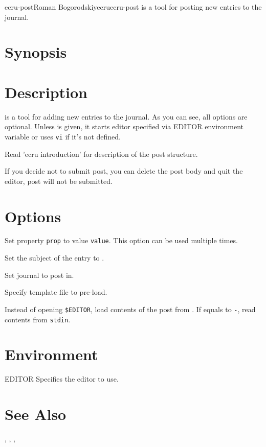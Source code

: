 \documentclass[english]{article}
\begin{document}
\begin{Name}{1}{ecru-post}{Roman Bogorodskiy}{ecru}{ecru-post}
	 is a tool for posting new entries to the journal.
\end{Name}

\section{Synopsis}

   
	 

 

\section{Description}
 is a tool for adding new entries to the journal. As you can see,
all options are optional. Unless  is given, it starts editor specified
via EDITOR environment variable or uses \texttt{vi} if it's not defined.

Read 'ecru introduction' for description of the post structure.

If you decide not to submit post, you can delete the post body and quit the editor,
post will not be submitted.
\section{Options}

\begin{Description}\setlength{\itemsep}{0cm}
\item[\OptArg{-D}{prop=value}] Set property \texttt{prop} to value \texttt{value}.
This option can be used multiple times.
\item[\OptArg{-s}{subject}] Set the subject of the entry to .
\item[\OptArg{-u}{journal}] Set journal to post in.
\item[\OptArg{-t}{template}] Specify template file to pre-load.
\item[\OptArg{-f}{filename}] Instead of opening \texttt{\$EDITOR}, load contents of the post
from . If  equals to \texttt{-}, read contents 
from \texttt{stdin}.
\end{Description}

\section{Environment}
\begin{Description}\setlength{\itemsep}{0cm}
\item[EDITOR] Specifies the editor to use.
\end{Description}

\section{See Also}

, , , 
\end{document}
